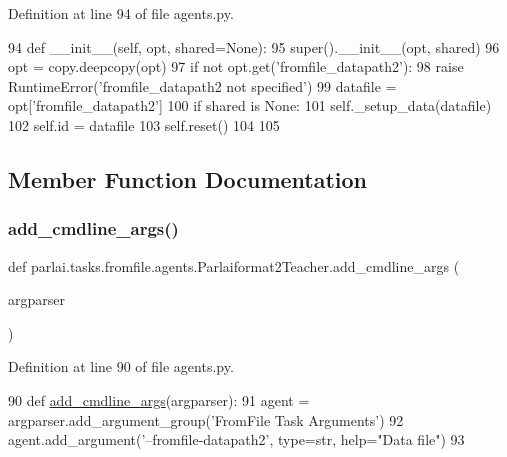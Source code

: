 Definition at line 94 of file agents.\+py.


\begin{DoxyCode}
94     \textcolor{keyword}{def }\_\_init\_\_(self, opt, shared=None):
95         super().\_\_init\_\_(opt, shared)
96         opt = copy.deepcopy(opt)
97         \textcolor{keywordflow}{if} \textcolor{keywordflow}{not} opt.get(\textcolor{stringliteral}{'fromfile\_datapath2'}):
98             \textcolor{keywordflow}{raise} RuntimeError(\textcolor{stringliteral}{'fromfile\_datapath2 not specified'})
99         datafile = opt[\textcolor{stringliteral}{'fromfile\_datapath2'}]
100         \textcolor{keywordflow}{if} shared \textcolor{keywordflow}{is} \textcolor{keywordtype}{None}:
101             self.\_setup\_data(datafile)
102         self.id = datafile
103         self.reset()
104 
105 
\end{DoxyCode}


\subsection{Member Function Documentation}
\mbox{\label{classparlai_1_1tasks_1_1fromfile_1_1agents_1_1Parlaiformat2Teacher_adbba4165f1d6690562c545fb48d1af06}} 
\subsubsection{\texorpdfstring{add\+\_\+cmdline\+\_\+args()}{add\_cmdline\_args()}}
{\footnotesize\ttfamily def parlai.\+tasks.\+fromfile.\+agents.\+Parlaiformat2\+Teacher.\+add\+\_\+cmdline\+\_\+args (\begin{DoxyParamCaption}\item[{}]{argparser }\end{DoxyParamCaption})\hspace{0.3cm}{\ttfamily [static]}}



Definition at line 90 of file agents.\+py.


\begin{DoxyCode}
90     \textcolor{keyword}{def }\hyperlink{namespaceparlai_1_1agents_1_1drqa_1_1config_a62fdd5554f1da6be0cba185271058320}{add\_cmdline\_args}(argparser):
91         agent = argparser.add\_argument\_group(\textcolor{stringliteral}{'FromFile Task Arguments'})
92         agent.add\_argument(\textcolor{stringliteral}{'--fromfile-datapath2'}, type=str, help=\textcolor{stringliteral}{"Data file"})
93 
\end{DoxyCode}


